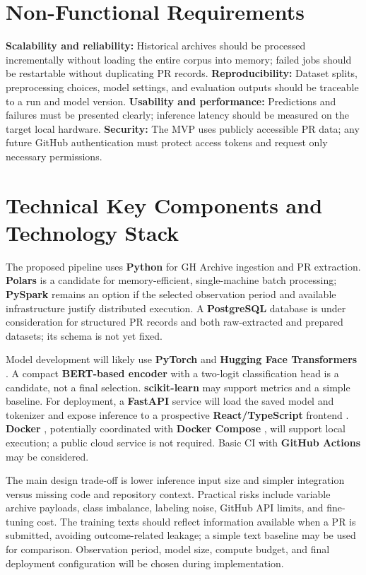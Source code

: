 \documentclass[conference,a4paper,flushend]{cs-techrep}
\begin{document}
\section{Non-Functional Requirements}
\textbf{Scalability and reliability:} Historical archives should be processed incrementally without loading the entire corpus into memory; failed jobs should be restartable without duplicating PR records. \textbf{Reproducibility:} Dataset splits, preprocessing choices, model settings, and evaluation outputs should be traceable to a run and model version. \textbf{Usability and performance:} Predictions and failures must be presented clearly; inference latency should be measured on the target local hardware. \textbf{Security:} The MVP uses publicly accessible PR data; any future GitHub authentication must protect access tokens and request only necessary permissions.

\section{Technical Key Components and Technology Stack}
The proposed pipeline uses \textbf{Python} for GH Archive ingestion and PR extraction. \textbf{Polars} \cite{polarsdocs} is a candidate for memory-efficient, single-machine batch processing; \textbf{PySpark} \cite{zaharia2016spark} remains an option if the selected observation period and available infrastructure justify distributed execution. A \textbf{PostgreSQL} database \cite{postgresdocs} is under consideration for structured PR records and both raw-extracted and prepared datasets; its schema is not yet fixed.

Model development will likely use \textbf{PyTorch} \cite{paszke2019pytorch} and \textbf{Hugging Face Transformers} \cite{wolf2020transformers}. A compact \textbf{BERT-based encoder} \cite{devlin2019bert} with a two-logit classification head is a candidate, not a final selection. \textbf{scikit-learn} \cite{pedregosa2011sklearn} may support metrics and a simple baseline. For deployment, a \textbf{FastAPI} service \cite{fastapidocs} will load the saved model and tokenizer and expose inference to a prospective \textbf{React/TypeScript} frontend \cite{reactdocs,typescriptdocs}. \textbf{Docker} \cite{merkel2014docker}, potentially coordinated with \textbf{Docker Compose} \cite{composedocs}, will support local execution; a public cloud service is not required. Basic CI with \textbf{GitHub Actions} \cite{githubactionsdocs} may be considered.

The main design trade-off is lower inference input size and simpler integration versus missing code and repository context. Practical risks include variable archive payloads, class imbalance, labeling noise, GitHub API limits, and fine-tuning cost. The training texts should reflect information available when a PR is submitted, avoiding outcome-related leakage; a simple text baseline may be used for comparison. Observation period, model size, compute budget, and final deployment configuration will be chosen during implementation.
\end{document}
